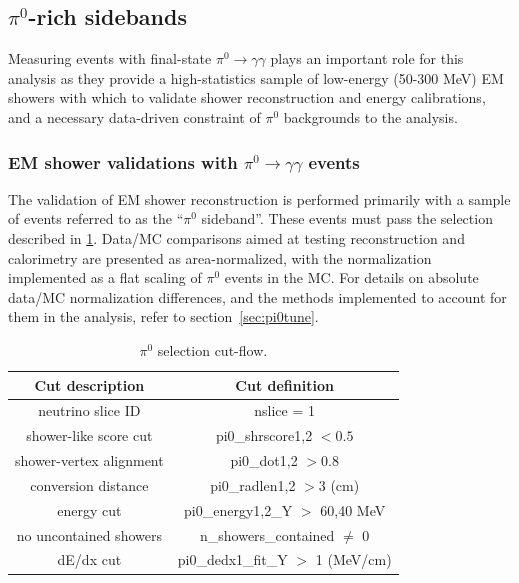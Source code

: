 \subsection{$\pi^0$-rich sidebands}
\label{sec:sideband:pi0}
Measuring events with final-state $\pi^0 \rightarrow \gamma\gamma$ plays an important role for this analysis as they provide a high-statistics sample of low-energy (50-300 MeV) EM showers with which to validate shower reconstruction and energy calibrations, and a necessary data-driven constraint of $\pi^0$ backgrounds to the analysis.

\subsubsection{EM shower validations with {$\pi^0 \rightarrow \gamma\gamma$ events}}

The validation of EM shower reconstruction is performed primarily with a sample of events referred to as the ``$\pi^0$ sideband''. These events must pass the selection described in \cref{tab:pi0sideband}. Data/MC comparisons aimed at testing reconstruction and calorimetry are presented as area-normalized, with the normalization implemented as a flat scaling of $\pi^0$ events in the MC. For details on absolute data/MC normalization differences, and the methods implemented to account for them in the analysis, refer to section~\ref{sec:pi0tune}.

\begin{table}[h!]
\centering
\setlength{\tabcolsep}{10pt}
\renewcommand{\arraystretch}{1.25}
 \begin{tabular}{| c | c |} 
 \hline
 Cut description & Cut definition \\
 \hline\hline
 neutrino slice ID & nslice = 1\\
 \hline
 shower-like score cut & pi0\_shrscore{1,2} $< 0.5$\\
 \hline
 shower-vertex alignment & pi0\_dot{1,2} $> 0.8$\\
 \hline
 conversion distance & pi0\_radlen{1,2} $> 3$ (cm)\\
 \hline
 energy cut & pi0\_energy{1,2}\_Y $>$ {60,40} MeV\\
 \hline
 no uncontained showers & n\_showers\_contained $\neq$ 0\\
 \hline
  dE/dx cut & pi0\_dedx1\_fit\_Y $>$ 1 (MeV/cm)\\
 \hline
 \end{tabular}
 \caption{\label{tab:pi0sideband} $\pi^0$ selection cut-flow.}
\end{table}

